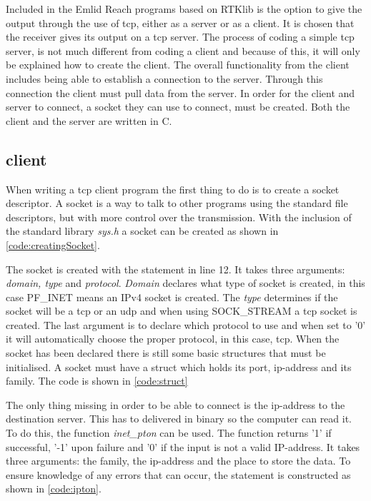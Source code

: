 Included in the Emlid Reach programs based on RTKlib is the option to give the output through the use of \gls{tcp}, either as a server or as a client. It is chosen that the receiver gives its output on a \gls{tcp} server. The process of coding a simple \gls{tcp} server, is not much different from coding a client and because of this, it will only be explained how to create the client. The overall functionality from the client includes being able to establish a connection to the server. Through this connection the client must pull data from the server. In order for the client and server to connect, a socket they can use to connect, must be created. Both the client and the server are written in C. 

\subsection{ client}\label{subsec:tcp_client}
When writing a \gls{tcp} client program the first thing to do is to create a socket descriptor. A socket is a way to talk to other programs using the standard file descriptors, but with more control over the transmission. With the inclusion of the standard library \textit{sys.h} a socket can be created as shown in \autoref{code:creatingSocket}.


The socket is created with the statement in line 12. It takes three arguments: \textit{domain, type} and \textit{protocol}. \textit{Domain} declares what type of socket is created, in this case PF_INET means an IPv4 socket is created. The \textit{type} determines if the socket will be a \gls{tcp} or an \gls{udp} and when using SOCK_STREAM a \gls{tcp} socket is created. The last argument is to declare which protocol to use and when set to '0' it will automatically choose the proper protocol, in this case, \gls{tcp}. When the socket has been declared there is still some basic structures that must be initialised. A socket must have a struct which holds its port, ip-address and its family. The code is shown in \autoref{code:struct}


The only thing missing in order to be able to connect is the \gls{ip}-address to the destination server. This has to delivered in binary so the computer can read it. To do this, the function \textit{inet_pton} can be used. The function returns '1' if successful, '-1' upon failure and '0' if the input is not a valid IP-address. It takes three arguments: the family, the \gls{ip}-address and the place to store the data. To ensure knowledge of any errors that can occur, the statement is constructed as shown in \autoref{code:ipton}.

